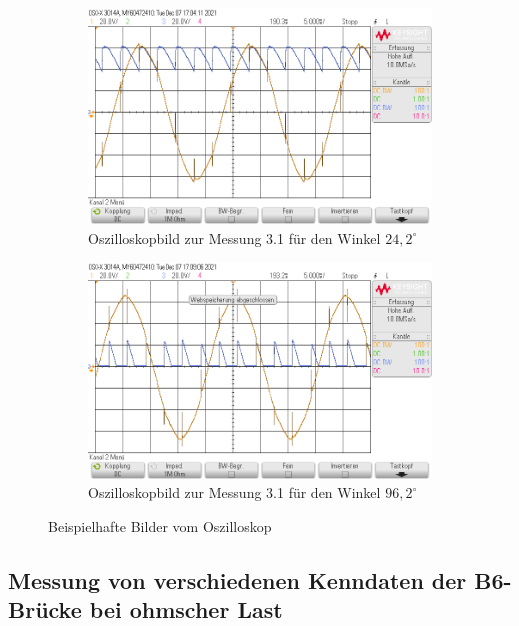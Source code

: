 \documentclass{article}
\begin{document}
\begin{figure}[h]
  \centering
  \begin{subfigure}{.45\textwidth}
    \centering
    \includegraphics[width=\linewidth]{../assets/images/GEP2/31_Winkel242.png}
    \caption{Oszilloskopbild zur Messung 3.1 für den Winkel $24,2^{\circ}$}
  \end{subfigure}
  \begin{subfigure}{.45\textwidth}
    \centering
    \includegraphics[width=\linewidth]{../assets/images/GEP2/31_Winkel962.png}
    \caption{Oszilloskopbild zur Messung 3.1 für den Winkel $96,2^{\circ}$}
  \end{subfigure}
  \label{fig:31_242}
  \caption{Beispielhafte Bilder vom Oszilloskop}
\end{figure}


\subsection{Messung von verschiedenen Kenndaten der B6-Brücke bei ohmscher Last}
\end{document}

